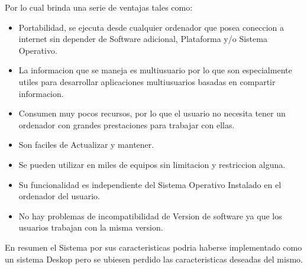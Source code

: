 Por lo cual brinda una serie de ventajas tales como:

\begin{itemize}
    \item Portabilidad, se ejecuta desde cualquier ordenador que posea coneccion a internet sin
        depender de Software adicional, Plataforma y/o Sistema Operativo.
    \item La informacion que se maneja es multiusuario por lo que son especialmente utiles para
        desarrollar aplicaciones multiusuarios basadas en compartir informacion.
    \item Consumen muy pocos recursos, por lo que el usuario no necesita tener un ordenador con 
        grandes prestaciones para trabajar con ellas.
    \item Son faciles de Actualizar y mantener.
    \item Se pueden utilizar en miles de equipos sin limitacion y restriccion alguna.
    \item Su funcionalidad es independiente del Sistema Operativo Instalado en el ordenador del 
            usuario.
    \item No hay problemas de incompatibilidad de Version de software ya que los usuarios trabajan 
        con la misma version.
\end{itemize}
En resumen el Sistema por sus caracteristicas podria haberse implementado como un sistema
Deskop pero se ubiesen perdido las caracteristicas deseadas del mismo.
